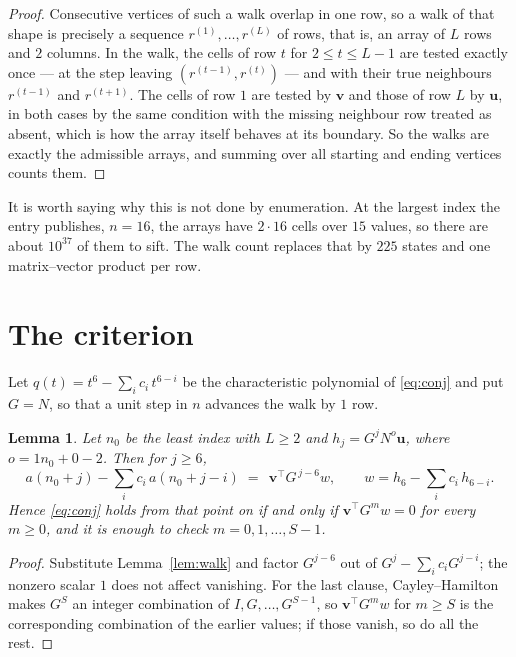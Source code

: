 \documentclass[11pt,a4paper]{article}
\theoremstyle{plain}
\newtheorem{lemma}[theorem]{Lemma}
\theoremstyle{definition}
\begin{document}
\begin{proof}
Consecutive vertices of such a walk overlap in one row, so a walk of that shape is
precisely a sequence $r^{(1)},\dots,r^{(L)}$ of rows, that is, an array of $L$ rows
and $2$ columns. In the walk, the cells of row $t$ for $2\le t\le L-1$ are tested
exactly once --- at the step leaving $(r^{(t-1)},r^{(t)})$ --- and with their true
neighbours $r^{(t-1)}$ and $r^{(t+1)}$. The cells of row $1$ are tested by
$\mathbf{v}$ and those of row $L$ by $\mathbf{u}$, in both cases by the same condition
with the missing neighbour row treated as absent, which is how the array itself behaves at
its boundary. So the walks are exactly the admissible arrays, and summing over all starting
and ending vertices counts them.
\end{proof}


It is worth saying why this is not done by enumeration. At the largest index the entry
publishes, $n=16$, the arrays have $2\cdot16$ cells over
$15$ values, so there are about $10^{37}$ of them to sift. The
walk count replaces that by $225$ states and one matrix--vector product per row.
\section{The criterion}

Let $q(t)=t^{6}-\sum_i c_i\,t^{6-i}$ be the characteristic polynomial of
\eqref{eq:conj} and put $G=N$, so that a unit step in $n$ advances the walk by
$1$ row.

\begin{lemma}\label{lem:crit}
Let $n_0$ be the least index with $L\ge2$ and $h_j=G^{j}N^{o}\mathbf{u}$, where
$o=1n_0+0-2$. Then for $j\ge6$,
\[
a(n_0+j)-\sum_i c_i\,a(n_0+j-i)\;=\;\,\mathbf{v}^{\!\top}G^{\,j-6}w,
\qquad w=h_{6}-\sum_i c_i\,h_{6-i} .
\]
Hence \eqref{eq:conj} holds from that point on if and only if
$\mathbf{v}^{\!\top}G^{m}w=0$ for every $m\ge0$, and it is enough to check
$m=0,1,\dots,S-1$.
\end{lemma}

\begin{proof}
Substitute Lemma~\ref{lem:walk} and factor $G^{j-6}$ out of
$G^{j}-\sum_ic_iG^{j-i}$; the nonzero scalar $1$ does not affect
vanishing. For the last clause, Cayley--Hamilton makes $G^{S}$ an integer combination of
$I,G,\dots,G^{S-1}$, so $\mathbf{v}^{\!\top}G^{m}w$ for $m\ge S$ is the corresponding
combination of the earlier values; if those vanish, so do all the rest.
\end{proof}
\end{document}
